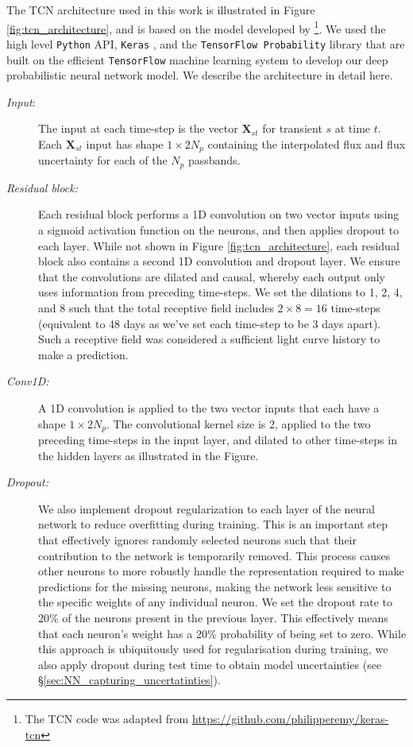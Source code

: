 \documentclass[fleqn,usenatbib]{mnras}
\begin{document}
The TCN architecture used in this work is illustrated in Figure \ref{fig:tcn_architecture}, and is based on the model developed by \citet{Bai2018}\footnote{The TCN code was adapted from  \url{https://github.com/philipperemy/keras-tcn}}. We used the high level \texttt{Python} API, \texttt{Keras} \citep{Keras}, and the \texttt{TensorFlow Probability} library that are built on the efficient \texttt{TensorFlow} machine learning system \citep{Abadi2015} to develop our deep probabilistic neural network model. We describe the architecture in detail here.
\begin{description}
    \item[\textit{Input}:] The input at each time-step is the vector $\bm{X}_{st}$ for transient $s$ at time $t$. Each $\bm{X}_{st}$ input has shape $1 \times 2N_p$ containing the interpolated flux and flux uncertainty for each of the $N_p$ passbands.
    \item[\textit{Residual block:}] Each residual block performs a 1D convolution on two vector inputs using a sigmoid activation function on the neurons, and then applies dropout to each layer. While not shown in Figure \ref{fig:tcn_architecture}, each residual block also contains a second 1D convolution and dropout layer. We ensure that the convolutions are dilated and causal, whereby each output only uses information from preceding time-steps. We set the dilations to 1, 2, 4, and 8 such that the total receptive field includes $2\times8 = 16$ time-steps (equivalent to 48 days as we've set each time-step to be 3 days apart). Such a receptive field was considered a sufficient light curve history to make a prediction.
    \item[\textit{Conv1D:}] A 1D convolution is applied to the two vector inputs that each have a shape $1 \times 2N_p$. The convolutional kernel size is 2, applied to the two preceding time-steps in the input layer, and dilated to other time-steps in the hidden layers as illustrated in the Figure.
    \item[\textit{Dropout:}] We also implement dropout regularization to each layer of the neural network to reduce overfitting during training. This is an important step that effectively ignores randomly selected neurons such that their contribution to the network is temporarily removed. This process causes other neurons to more robustly handle the representation required to make predictions for the missing neurons, making the network less sensitive to the specific weights of any individual neuron. We set the dropout rate to 20\% of the neurons present in the previous layer. This effectively means that each neuron's weight has a 20\% probability of being set to zero. While this approach is ubiquitously used for regularisation during training, we also apply dropout during test time to obtain model uncertainties (see \S\ref{sec:NN_capturing_uncertatinties}).

\end{description}
\end{document}
